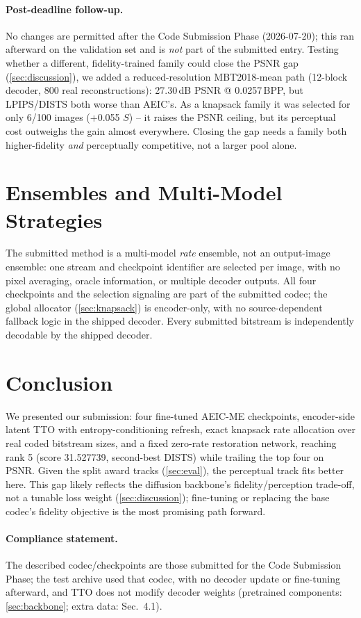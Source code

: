 \documentclass[runningheads]{llncs}
\begin{document}
\paragraph{Post-deadline follow-up.} No changes are permitted after the Code Submission Phase (2026-07-20); this ran afterward on the validation set and is \emph{not} part of the submitted entry. Testing whether a different, fidelity-trained family could close the PSNR gap (\cref{sec:discussion}), we added a reduced-resolution MBT2018-mean path (12-block decoder, 800 real reconstructions): 27.30\,dB PSNR @ 0.0257\,BPP, but LPIPS/DISTS both worse than AEIC's. As a knapsack family it was selected for only 6/100 images (+0.055 $S$) -- it raises the PSNR ceiling, but its perceptual cost outweighs the gain almost everywhere. Closing the gap needs a family both higher-fidelity \emph{and} perceptually competitive, not a larger pool alone.

\section{Ensembles and Multi-Model Strategies}
The submitted method is a multi-model \emph{rate} ensemble, not an output-image ensemble: one stream and checkpoint identifier are selected per image, with no pixel averaging, oracle information, or multiple decoder outputs. All four checkpoints and the selection signaling are part of the submitted codec; the global allocator (\cref{sec:knapsack}) is encoder-only, with no source-dependent fallback logic in the shipped decoder. Every submitted bitstream is independently decodable by the shipped decoder.

\section{Conclusion}
We presented our submission: four fine-tuned AEIC-ME checkpoints, encoder-side latent TTO with entropy-conditioning refresh, exact knapsack rate allocation over real coded bitstream sizes, and a fixed zero-rate restoration network, reaching rank 5 (score 31.527739, second-best DISTS) while trailing the top four on PSNR. Given the split award tracks (\cref{sec:eval}), the perceptual track fits better here. This gap likely reflects the diffusion backbone's fidelity/perception trade-off, not a tunable loss weight (\cref{sec:discussion}); fine-tuning or replacing the base codec's fidelity objective is the most promising path forward.

\paragraph{Compliance statement.} The described codec/checkpoints are those submitted for the Code Submission Phase; the test archive used that codec, with no decoder update or fine-tuning afterward, and TTO does not modify decoder weights (pretrained components: \cref{sec:backbone}; extra data: Sec.~4.1).



\end{document}
